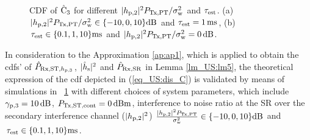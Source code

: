 \begin{figure}[!ht]
{\label{fig_US:CDF_C1_s}}
\hfil
{}
\vspace{0.3cm}
\caption{CDF of $\hat{\text{{C}}}_{\text{3}}$ for different $|h_{\text{p,2}}|^2 P_{\text{Tx,PT}}/\sigma^2_{\text{w}}$ and $\tau_{\text{est}}$. (a) $|h_{\text{p,2}}|^2 P_{\text{Tx,PT}}/\sigma^2_{\text{w}} \in \{-10, 0, 10\} \SI{}{dB}$ and $\tau_{\text{est}} = \SI{1}{ms}$, (b) $\tau_{\text{est}} \in \{0.1, 1, 10\} \SI{}{ms}$ and $|h_{\text{p,2}}|^2 P_{\text{Tx,PT}}/\sigma^2_{\text{w}} = \SI{0}{dB}$.}%
\label{fig_US:CDF_eca}
\vspace{-0.5cm}
\end{figure}
In consideration to the Approximation \ref{ap:ap1}, which is applied to obtain the cdfs' of $\hat{P}_{\text{Rx,ST,$h_{\text{p,3}}$}}$, $|\hat{h}_{\text{s}}|^2$ and $\hat{P}_{\text{Rx,SR}}$ in Lemma \ref{lm_US:lm5}, the theoretical expression of the cdf depicted in (\ref{eq_US:dis_C}) is validated by means of simulations in \figurename~\ref{fig_US:CDF_eca} with different choices of system parameters, which include ${\gamma}_{\text{p,3}} = \SI{10}{dB}$, $P_{\text{Tx,ST,cont}} = \SI{0}{dBm}$, interference to noise ratio at the SR over the secondary interference channel ($|h_{\text{p,2}}|^2$) $\frac{|h_{\text{p,2}}|^2 P_{\text{Tx,PT}}}{\sigma^2_{\text{w}}} \in \{-10, 0, 10\} \SI{}{dB}$ and $\tau_{\text{est}} \in \{0.1, 1, 10\} \SI{}{ms}$.

